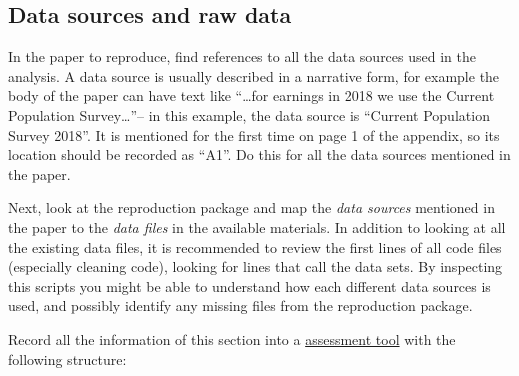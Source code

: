 \documentclass[]{book}
\begin{document}
\hypertarget{data-sources-and-raw-data}{%
\subsection{Data sources and raw data}\label{data-sources-and-raw-data}}

In the paper to reproduce, find references to all the data sources used in the analysis. A data source is usually described in a narrative form, for example the body of the paper can have text like ``\ldots{}for earnings in 2018 we use the Current Population Survey\ldots{}''-- in this example, the data source is ``Current Population Survey 2018''. It is mentioned for the first time on page 1 of the appendix, so its location should be recorded as ``A1''. Do this for all the data sources mentioned in the paper.

Next, look at the reproduction package and map the \emph{data sources} mentioned in the paper to the \emph{data files} in the available materials. In addition to looking at all the existing data files, it is recommended to review the first lines of all code files (especially cleaning code), looking for lines that call the data sets. By inspecting this scripts you might be able to understand how each different data sources is used, and possibly identify any missing files from the reproduction package.

Record all the information of this section into a \href{https://docs.google.com/spreadsheets/d/1LUIdVFH0OfR70C7z07TYeE-uWzKI_JIeWUMaYhqEKK0/edit\#gid=0\&range=A1}{assessment tool} with the following structure:
\end{document}
